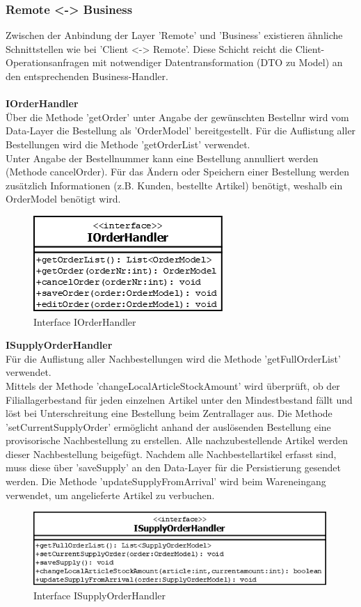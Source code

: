\subsubsection{Remote <-> Business}
Zwischen der Anbindung der Layer 'Remote' und 'Business' existieren ähnliche Schnittstellen wie bei 'Client <-> Remote'. Diese Schicht reicht die Client-Operationsanfragen mit notwendiger Datentransformation (DTO zu Model) an den entsprechenden Business-Handler.\\\\
\textbf{IOrderHandler}\\
Über die Methode 'getOrder' unter Angabe der gewünschten Bestellnr wird vom Data-Layer die Bestellung als 'OrderModel' bereitgestellt. Für die Auflistung aller Bestellungen wird die Methode 'getOrderList' verwendet.\\
Unter Angabe der Bestellnummer kann eine Bestellung annulliert werden (Methode cancelOrder). Für das Ändern oder Speichern einer Bestellung werden zusätzlich Informationen (z.B. Kunden, bestellte Artikel) benötigt, weshalb ein OrderModel benötigt wird. 
\begin{figure}[H]
	\includegraphics[width=0.3\linewidth]{Images/IOrderHandler}
	\caption{Interface IOrderHandler}
	\label{fig:if-IOrderHandler}
\end{figure}
\textbf{ISupplyOrderHandler}\\
Für die Auflistung aller Nachbestellungen wird die Methode 'getFullOrderList' verwendet.\\
Mittels der Methode 'changeLocalArticleStockAmount' wird überprüft, ob der Filiallagerbestand für jeden einzelnen Artikel unter den Mindestbestand fällt und löst bei Unterschreitung eine Bestellung beim Zentrallager aus. Die Methode 'setCurrentSupplyOrder' ermöglicht anhand der auslösenden Bestellung eine provisorische Nachbestellung zu erstellen. Alle nachzubestellende Artikel werden dieser Nachbestellung beigefügt. Nachdem alle Nachbestellartikel erfasst sind, muss diese über 'saveSupply' an den Data-Layer für die Persistierung gesendet werden. Die Methode 'updateSupplyFromArrival' wird beim Wareneingang verwendet, um angelieferte Artikel zu verbuchen. 
\begin{figure}[H]
	\includegraphics[width=0.6\linewidth]{Images/ISupplyOrderHandler}
	\caption{Interface ISupplyOrderHandler}
	\label{fig:if-ISupplyOrderHandler}
\end{figure}
